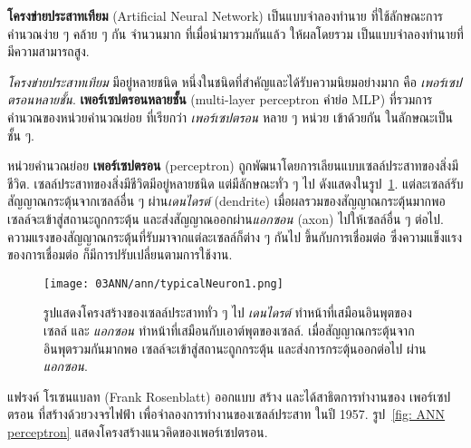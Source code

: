 \textbf{โครงข่ายประสาทเทียม} (Artificial Neural Network)
เป็นแบบจำลองทำนาย
ที่ใช้ลักษณะการคำนวณง่าย ๆ คล้าย ๆ กัน จำนวนมาก
ที่เมื่อนำมารวมกันแล้ว ให้ผลโดยรวม เป็นแบบจำลองทำนายที่มีความสามารถสูง.

\textit{โครงข่ายประสาทเทียม} มีอยู่หลายชนิด
หนึ่งในชนิดที่สำคัญและได้รับความนิยมอย่างมาก
คือ \textit{เพอร์เซปตรอนหลายชั้น}.
\textbf{เพอร์เซปตรอนหลายชั้น} (multi-layer perceptron คำย่อ MLP)
ที่รวมการคำนวณของหน่วยคำนวณย่อย ที่เรียกว่า 
\textit{เพอร์เซปตรอน} หลาย ๆ หน่วย
เข้าด้วยกัน
ในลักษณะเป็นชั้น ๆ.

หน่วยคำนวณย่อย \textbf{เพอร์เซปตรอน} (perceptron)
ถูกพัฒนาโดยการเลียนแบบเซลล์ประสาทของสิ่งมีชีวิต.
%
เซลล์ประสาทของสิ่งมีชีวิตมีอยู่หลายชนิด
แต่มีลักษณะทั่ว ๆ ไป 
ดังแสดงในรูป~\ref{fig: ANN neuron}.
แต่ละเซลล์รับสัญญาณกระตุ้นจากเซลล์อื่น ๆ ผ่าน\textit{เดนไดรต์} (dendrite)
เมื่อผลรวมของสัญญาณกระตุ้นมากพอเซลล์จะเข้าสู่สถานะถูกกระตุ้น และส่งสัญญาณออกผ่าน\textit{แอกซอน} (axon)
ไปให้เซลล์อื่น ๆ ต่อไป.
ความแรงของสัญญาณกระตุ้นที่รับมาจากแต่ละเซลล์ก็ต่าง ๆ กันไป ขึ้นกับการเชื่อมต่อ ซึ่งความแข็งแรงของการเชื่อมต่อ ก็มีการปรับเปลี่ยนตามการใช้งาน.

%
\begin{figure}
	\begin{center}
		\texttt{[image: 03ANN/ann/typicalNeuron1.png]}
	\end{center}
	\caption[เซลล์ประสาท]{รูปแสดงโครงสร้างของเซลล์ประสาททั่ว ๆ ไป
		\textit{เดนไดรต์}  ทำหน้าที่เสมือนอินพุตของเซลล์ 
		และ \textit{แอกซอน}  ทำหน้าที่เสมือนกับเอาต์พุตของเซลล์. 
เมื่อสัญญาณกระตุ้นจากอินพุตรวมกันมากพอ
เซลล์จะเข้าสู่สถานะถูกกระตุ้น 
และส่งการกระตุ้นออกต่อไป ผ่าน\textit{แอกซอน}.
	}
	\label{fig: ANN neuron}
\end{figure}
%

แฟรงค์ โรเซนแบลท (Frank Rosenblatt) ออกแบบ สร้าง และได้สาธิตการทำงานของ
เพอร์เซปตรอน 
ที่สร้างด้วยวงจรไฟฟ้า
เพื่อจำลองการทำงานของเซลล์ประสาท
ในปี 1957. 
รูป~\ref{fig: ANN perceptron} แสดงโครงสร้างแนวคิดของเพอร์เซปตรอน.

